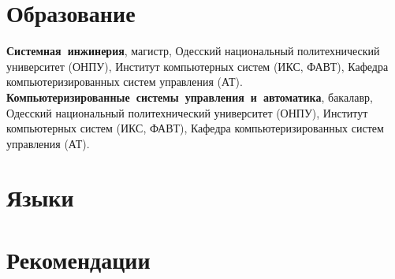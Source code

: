 \documentclass[12pt,a4paper,serif]{moderncv}
\begin{document}
	\section{Образование}
			{\textbf{\mbox{Системная инжинерия}}, магистр,
			\newline Одесский национальный политехнический университет (ОНПУ),
			\newline Институт компьютерных систем (ИКС, ФАВТ),
			\newline Кафедра компьютеризированных систем управления (АТ).}
			{\textbf{\mbox{Компьютеризированные системы управления и автоматика}},
				бакалавр,
			\newline Одесский национальный политехнический университет (ОНПУ),
			\newline Институт компьютерных систем (ИКС, ФАВТ),
			\newline Кафедра компьютеризированных систем управления (АТ).}
		
	\section{Языки}
	
	\section{Рекомендации}
\end{document}
